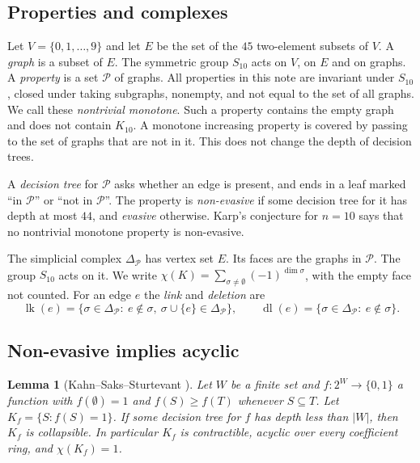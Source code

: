 \documentclass[11pt]{article}
\theoremstyle{plain}
\newtheorem{lemma}[theorem]{Lemma}
\theoremstyle{definition}
\theoremstyle{remark}
\newcommand{\PP}{\mathcal P}
\newcommand{\Del}{\Delta_{\mathcal P}}
\newcommand{\lk}{\operatorname{lk}}
\newcommand{\dl}{\operatorname{dl}}
\begin{document}
\subsection{Properties and complexes}

Let $V=\{0,1,\dots,9\}$ and let $E$ be the set of the $45$ two-element subsets of $V$.
A \emph{graph} is a subset of $E$.
The symmetric group $S_{10}$ acts on $V$, on $E$ and on graphs.
A \emph{property} is a set $\PP$ of graphs.
All properties in this note are
invariant under $S_{10}$,
closed under taking subgraphs,
nonempty, and
not equal to the set of all graphs.
We call these \emph{nontrivial monotone}.
Such a property contains the empty graph and does not contain $K_{10}$.
A monotone increasing property is covered by passing to the set of graphs that are not in it.
This does not change the depth of decision trees.

A \emph{decision tree} for $\PP$ asks whether an edge is present, and ends in a leaf marked ``in $\PP$'' or ``not in $\PP$''.
The property is \emph{non-evasive} if some decision tree for it has depth at most $44$, and \emph{evasive} otherwise.
Karp's conjecture for $n=10$ says that no nontrivial monotone property is non-evasive.

The simplicial complex $\Del$ has vertex set $E$.
Its faces are the graphs in $\PP$.
The group $S_{10}$ acts on it.
We write $\chi(K)=\sum_{\sigma\ne\emptyset}(-1)^{\dim\sigma}$, with the empty face not counted.
For an edge $e$ the \emph{link} and \emph{deletion} are
\[
\lk(e)=\{\sigma\in\Del:\ e\notin\sigma,\ \sigma\cup\{e\}\in\Del\},\qquad
\dl(e)=\{\sigma\in\Del:\ e\notin\sigma\}.
\]

\subsection{Non-evasive implies acyclic}

\begin{lemma}[Kahn--Saks--Sturtevant \cite{KSS}]\label{lem:kss}
Let $W$ be a finite set and $f:2^W\to\{0,1\}$ a function with $f(\emptyset)=1$ and $f(S)\ge f(T)$ whenever $S\subseteq T$.
Let $K_f=\{S: f(S)=1\}$.
If some decision tree for $f$ has depth less than $|W|$, then $K_f$ is collapsible.
In particular $K_f$ is contractible, acyclic over every coefficient ring, and $\chi(K_f)=1$.
\end{lemma}
\end{document}
